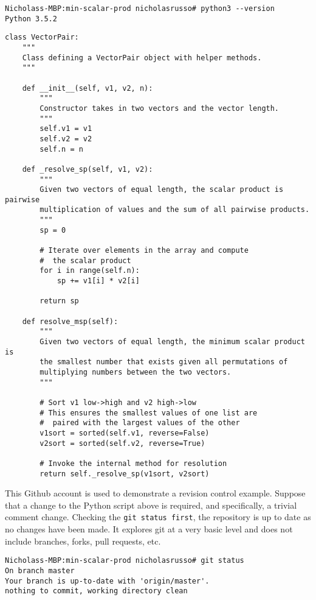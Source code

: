 \begin{verbatim}
Nicholass-MBP:min-scalar-prod nicholasrusso# python3 --version
Python 3.5.2
\end{verbatim}

\begin{verbatim}
class VectorPair:
    """
	Class defining a VectorPair object with helper methods.
	"""

    def __init__(self, v1, v2, n):
        """
        Constructor takes in two vectors and the vector length.
        """
        self.v1 = v1
        self.v2 = v2
        self.n = n

    def _resolve_sp(self, v1, v2):
        """
        Given two vectors of equal length, the scalar product is pairwise
        multiplication of values and the sum of all pairwise products.
        """
        sp = 0

        # Iterate over elements in the array and compute
        #  the scalar product
        for i in range(self.n):
            sp += v1[i] * v2[i]

        return sp

    def resolve_msp(self):
        """
        Given two vectors of equal length, the minimum scalar product is
        the smallest number that exists given all permutations of
        multiplying numbers between the two vectors.
        """

        # Sort v1 low->high and v2 high->low
        # This ensures the smallest values of one list are
        #  paired with the largest values of the other
        v1sort = sorted(self.v1, reverse=False)
        v2sort = sorted(self.v2, reverse=True)

        # Invoke the internal method for resolution
        return self._resolve_sp(v1sort, v2sort)
\end{verbatim}

This Github account is used to demonstrate a revision
control example. Suppose that a change to the Python script above is required,
and specifically, a trivial comment change. Checking the \verb|git status first|,
the repository is up to date as no changes have been made. It explores git at
a very basic level and does not include branches, forks, pull requests, etc.

\begin{verbatim}
Nicholass-MBP:min-scalar-prod nicholasrusso# git status
On branch master
Your branch is up-to-date with 'origin/master'.
nothing to commit, working directory clean
\end{verbatim}

